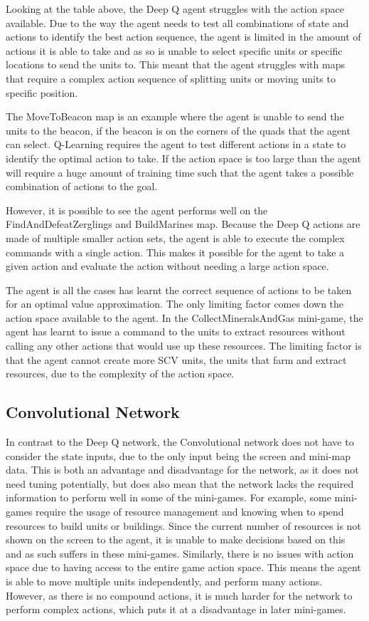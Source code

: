 Looking at the table above, the Deep Q agent struggles with the action space
available. Due to the way the agent needs to test all combinations of state and
actions to identify the best action sequence, the agent is limited in the amount
of actions it is able to take and as so is unable to select specific units or
specific locations to send the units to. This meant that the agent struggles
with maps that require a complex action sequence of splitting units or moving
units to specific position.

The MoveToBeacon map is an example where the agent is unable to send the units
to the beacon, if the beacon is on the corners of the quads that the agent can
select. Q-Learning requires the agent to test different actions in a state to
identify the optimal action to take. If the action space is too large than the
agent will require a huge amount of training time such that the agent takes a
possible combination of actions to the goal.

However, it is possible to see the agent performs well on the
FindAndDefeatZerglings and BuildMarines map. Because the Deep Q actions are made
of multiple smaller action sets, the agent is able to execute the complex
commands with a single action. This makes it possible for the agent to take a
given action and evaluate the action without needing a large action space.

The agent is all the cases has learnt the correct sequence of actions to be
taken for an optimal value approximation. The only limiting factor comes down
the action space available to the agent. In the CollectMineralsAndGas mini-game,
the agent has learnt to issue a command to the units to extract resources
without calling any other actions that would use up these resources. The
limiting factor is that the agent cannot create more SCV units, the units that
farm and extract resources, due to the complexity of the action space.

\subsection{Convolutional Network}

In contrast to the Deep Q network, the Convolutional network does not have to
consider the state inputs, due to the only input being the screen and mini-map
data. This is both an advantage and disadvantage for the network, as it does not
need tuning potentially, but does also mean that the network lacks the required
information to perform well in some of the mini-games. For example, some
mini-games require the usage of resource management and knowing when to spend
resources to build units or buildings. Since the current number of resources is
not shown on the screen to the agent, it is unable to make decisions based on
this and as such suffers in these mini-games.
Similarly, there is no issues with action space due to having access to the
entire game action space. This means the agent is able to move multiple units
independently, and perform many actions. However, as there is no compound
actions, it is much harder for the network to perform complex actions, which
puts it at a disadvantage in later mini-games.

